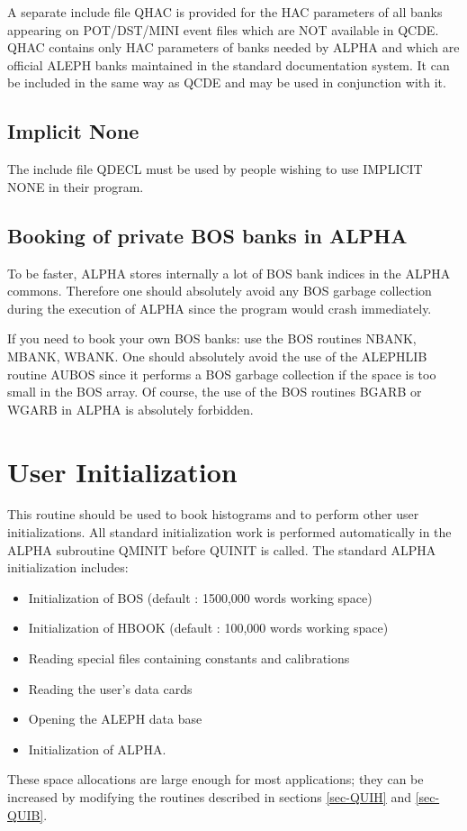 A separate include file QHAC is provided for the HAC
parameters of all banks appearing on POT/DST/MINI
event files which are NOT
available in QCDE. QHAC contains only HAC parameters of banks
needed by ALPHA and which are official ALEPH banks maintained 
in the standard documentation system. 
It 
can be included in the same way as
QCDE and may be used in conjunction with it. 
 
\par
\subsection{\label{sec-UIMP}Implicit None}
\par
The include file  QDECL must be used by         
 people wishing to use IMPLICIT NONE in their program.
\par
 
\par
\subsection{\label{sec-UBNK}Booking of private BOS banks in ALPHA}
\par
To be faster, ALPHA stores internally a lot of BOS bank indices in the ALPHA
commons. Therefore one should absolutely avoid any BOS garbage collection
during the execution of ALPHA since the program would crash immediately.
\par
 If you need to book your own BOS banks:
 use the BOS routines NBANK, MBANK, WBANK. One should
absolutely avoid the use of the ALEPHLIB routine AUBOS since it performs a
BOS garbage collection if the space is too small in the BOS array. Of course,
the use of the BOS routines BGARB or WGARB in ALPHA is absolutely forbidden.
 
 
\par
 
\section{\label{sec-UI}User Initialization}
\par
{}
\par This routine should be used to book histograms and to perform
other user initializations.
All standard initialization work is performed automatically in the ALPHA
subroutine QMINIT before QUINIT is called. The standard ALPHA initialization includes:
\begin{itemize}
\item Initialization of BOS (default : 1500,000 words working space)
\item Initialization of HBOOK (default : 100,000 words working space)
\item Reading special files containing constants and calibrations
\item Reading the user's data cards
\item Opening the ALEPH data base
\item Initialization of ALPHA.
\end{itemize}
These space allocations are large enough for most applications; they
can be increased by modifying the routines described in
sections \ref{sec-QUIH} and \ref{sec-QUIB}.
 
